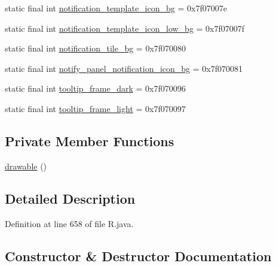 \begin{DoxyCompactItemize}
\item 
static final int \mbox{\hyperlink{classandroid_1_1support_1_1design_1_1_r_1_1drawable_ad7bdcd3290edcef20952638a119d6d7d}{notification\+\_\+template\+\_\+icon\+\_\+bg}} = 0x7f07007e
\item 
static final int \mbox{\hyperlink{classandroid_1_1support_1_1design_1_1_r_1_1drawable_ae8372977a726225f12d335b46c8cbdd4}{notification\+\_\+template\+\_\+icon\+\_\+low\+\_\+bg}} = 0x7f07007f
\item 
static final int \mbox{\hyperlink{classandroid_1_1support_1_1design_1_1_r_1_1drawable_aed253f648342d853c111c529ab96e605}{notification\+\_\+tile\+\_\+bg}} = 0x7f070080
\item 
static final int \mbox{\hyperlink{classandroid_1_1support_1_1design_1_1_r_1_1drawable_a67fcab12d08eec3c5fd99deabf1e0c18}{notify\+\_\+panel\+\_\+notification\+\_\+icon\+\_\+bg}} = 0x7f070081
\item 
static final int \mbox{\hyperlink{classandroid_1_1support_1_1design_1_1_r_1_1drawable_ad541536a37b940afd49330600c8e6fb1}{tooltip\+\_\+frame\+\_\+dark}} = 0x7f070096
\item 
static final int \mbox{\hyperlink{classandroid_1_1support_1_1design_1_1_r_1_1drawable_aafa93bfc1b95635189723fd95253b79c}{tooltip\+\_\+frame\+\_\+light}} = 0x7f070097
\end{DoxyCompactItemize}
\subsection*{Private Member Functions}
\begin{DoxyCompactItemize}
\item 
\mbox{\hyperlink{classandroid_1_1support_1_1design_1_1_r_1_1drawable_a0cf5588240d9d8a4858953a7fd155cb8}{drawable}} ()
\end{DoxyCompactItemize}


\subsection{Detailed Description}


Definition at line 658 of file R.\+java.



\subsection{Constructor \& Destructor Documentation}
\mbox{\label{classandroid_1_1support_1_1design_1_1_r_1_1drawable_a0cf5588240d9d8a4858953a7fd155cb8}} 
